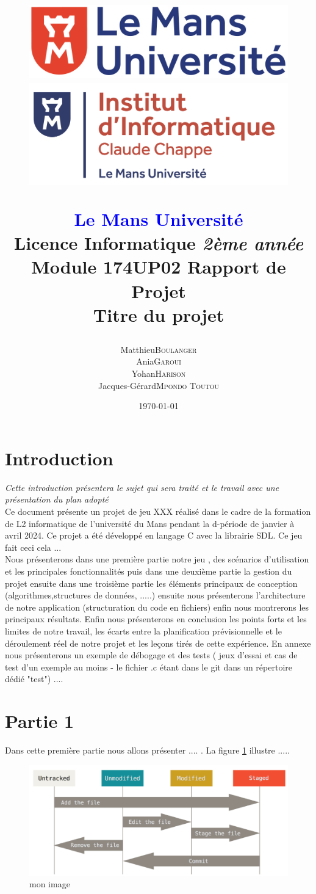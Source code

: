 \documentclass[a4paper,12pt]{article}
\title{
    \begin{figure}[!t]
    \begin{minipage}{.25\textwidth}
    \includegraphics[width=\textwidth]{img/logo_lmu.png}
    \end{minipage}
    \hspace{.5\textwidth}
    \begin{minipage}{.25\textwidth}
    \includegraphics[width=\textwidth]{img/logo_ic2.png}
    \end{minipage}
    \end{figure}
    \begin{center}
	\textbf{\textcolor{blue}{Le Mans Université}} \\
	Licence Informatique \textit{2ème année} \\
	Module 174UP02 Rapport de Projet \\
	\textbf{Titre du projet}
    \end{center}
}
\author{
	\begin{tabular}{rl}
	    Matthieu & \textsc{Boulanger} \\
	    Ania & \textsc{Garoui} \\
	    Yohan & \textsc{Harison} \\
	    Jacques-Gérard & \textsc{Mpondo Toutou}
	\end{tabular}
}
\date{\today}
\begin{document}
\maketitle
\newpage

\tableofcontents
\newpage


\section{Introduction}

\textit{Cette introduction présentera le sujet qui sera traité et le travail avec une présentation du plan adopté} \\
Ce document présente un projet de jeu XXX réalisé dans le cadre de la formation de L2 informatique de l’université du Mans pendant la d-période de janvier à avril 2024.
Ce projet a été développé en langage C avec la librairie SDL.
Ce jeu fait ceci cela ... \\
Nous présenterons dans une première partie notre jeu , des scénarios d’utilisation et les principales fonctionnalités puis dans une deuxième partie la gestion du projet ensuite dans une troisième partie les éléments principaux de conception (algorithmes,structures de données, .....) ensuite nous présenterons l’architecture de notre application (structuration du code en fichiers) enfin nous montrerons les principaux résultats.
Enfin nous présenterons en conclusion les points forts et les limites de notre travail, les écarts entre la planification prévisionnelle et le déroulement réel de notre projet et les leçons tirés de cette expérience. En annexe nous présenterons un exemple de débogage et des tests ( jeux d’essai et cas de test d’un exemple au moins - le fichier .c étant dans le git dans un répertoire dédié "test") ....

\section{Partie 1}

Dans cette première partie nous allons présenter .... . La figure \ref{mon_image} illustre .....
\begin{figure}[h]
    \begin{center}
	\includegraphics[width=.85\textwidth]{img/mon_image.png}
	\caption{mon image}
	\label{mon_image}
    \end{center}
\end{figure}
\end{document}
